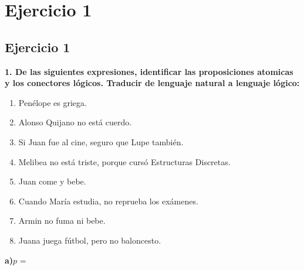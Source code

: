 
\chapter*{Ejercicio 1}
\section*{Ejercicio 1}
\noindent\textbf{1. De las siguientes expresiones, identificar las proposiciones atomicas y los conectores lógicos. Traducir de lenguaje natural a lenguaje lógico:}

\begin{multicols}{2}
	\begin{enumerate}[label=\alph*)]
		\item Penélope es griega.
		\item Alonso Quijano no está cuerdo.
		\item Si Juan fue al cine, seguro que Lupe también.
		\item Melibea no está triste, porque cursó Estructuras Discretas.
		\item Juan come y bebe.
		\item Cuando María estudia, no reprueba los exámenes.
		\item Armin no fuma ni bebe.
		\item Juana juega fútbol, pero no baloncesto.
	\end{enumerate}
\end{multicols}

\textbf{a)}$p$ = 